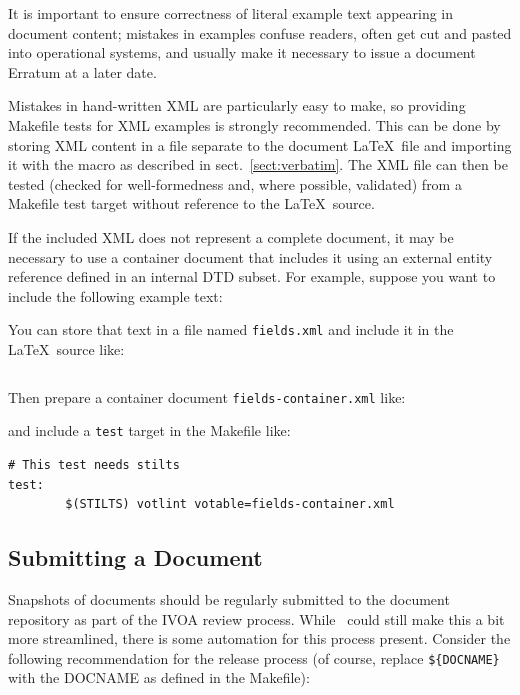 \documentclass[11pt,a4paper]{ivoa}
\begin{document}
It is important to ensure correctness of literal example text appearing
in document content;
mistakes in examples confuse readers,
often get cut and pasted into operational systems,
and usually make it necessary to issue a document Erratum at a later date.

Mistakes in hand-written XML are particularly easy to make,
so providing Makefile tests for XML examples is strongly recommended.
This can be done by storing XML content in a file separate to the
document \LaTeX\ file and importing it with the \verb||
macro as described in sect.~\ref{sect:verbatim}.
The XML file can then be tested (checked for well-formedness and,
where possible, validated) from a Makefile test target without reference
to the \LaTeX\ source.

If the included XML does not represent a complete document, it may be
necessary to use a container document that includes it using an
external entity reference defined in an internal DTD subset.
For example, suppose you want to include the following example text:

You can store that text in a file named \verb|fields.xml| and
include it in the \LaTeX\ source like:
\begin{lstlisting}[basicstyle=\footnotesize]

\end{lstlisting}
Then prepare a container document \verb|fields-container.xml| like:

and include a \verb|test| target in the Makefile like:
\begin{lstlisting}[basicstyle=\footnotesize]
# This test needs stilts
test:
        $(STILTS) votlint votable=fields-container.xml
\end{lstlisting}


\subsection{Submitting a Document}
\label{sect:submitting}

Snapshots of documents should be regularly submitted to the document
repository as part of the IVOA review process.  While \ivoatex~could
still make this a bit more streamlined, there is some automation for
this process present.  Consider the following recommendation for the
release process (of course, replace \verb|${DOCNAME}| with the DOCNAME
as defined in the Makefile):
\end{document}
